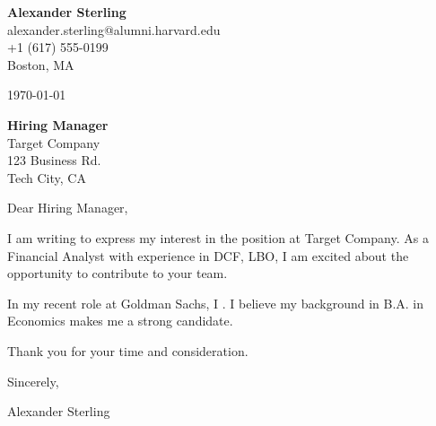 \documentclass[a4paper,11pt]{article}
\begin{document}
\noindent \textbf{Alexander Sterling} \\
alexander.sterling@alumni.harvard.edu \\
+1 (617) 555-0199 \\
Boston, MA

\vspace{1cm}

\noindent \today

\vspace{1cm}

\noindent \textbf{Hiring Manager} \\
Target Company \\
123 Business Rd. \\
Tech City, CA

\vspace{1cm}

\noindent Dear Hiring Manager,

\vspace{0.5cm}

\noindent I am writing to express my interest in the position at Target Company. As a Financial Analyst with experience in DCF, LBO, I am excited about the opportunity to contribute to your team.

\vspace{0.5cm}

\noindent In my recent role at Goldman Sachs, I . I believe my background in B.A. in Economics makes me a strong candidate.

\vspace{0.5cm}

\noindent Thank you for your time and consideration.

\vspace{1cm}

\noindent Sincerely,

\vspace{1cm}

\noindent Alexander Sterling
\end{document}
